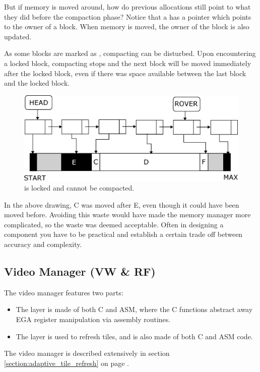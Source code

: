\documentclass[book.tex]{subfiles}
\begin{document}
 \par
But if memory is moved around, how do previous allocations still point to what they did before the compaction phase? Notice that a  has a  pointer which points to the owner of a block.  When memory is moved, the owner of the block is also updated.\\
\par
As some blocks are marked as , compacting can be disturbed. Upon encountering a locked block, compacting stops and the next block will be moved immediately after the locked block, even if there was space available between the last block and the locked block.\\
   \par
\begin{figure}[H]
\centering
 \includegraphics[width=\textwidth]{imgs/drawings/mm_bad_compact.eps}
 \caption{ is locked and cannot be compacted.}
 \end{figure}
 \par
  In the above drawing, C was moved after E, even though it could have been moved before. Avoiding this waste would have made the memory manager more complicated, so the waste was deemed acceptable. Often in designing a component you have to be practical and establish a certain trade off between accuracy and complexity.\\
  \par
  
  
  


\subsection{Video Manager (VW \& RF)}
The video manager features two parts:
\begin{itemize}
\item The  layer is made of both C and ASM, where the C functions abstract away EGA register manipulation via assembly routines. 
\item The  layer is used to refresh tiles, and is also made of both C and ASM code.
\end{itemize}
The video manager is described extensively in section \ref{section:adaptive_tile_refresh} on page \pageref{section:adaptive_tile_refresh}.
\par
\end{document}
